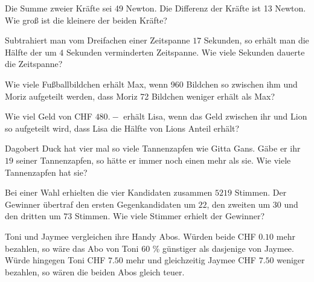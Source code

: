 \begin{bbwAufgabenBlock}


\item Die Summe zweier Kräfte sei 49 Newton. Die Differenz der Kräfte
ist 13 Newton. Wie groß ist die kleinere der beiden Kräfte?


\item Subtrahiert man vom Dreifachen einer Zeitspanne $17$ Sekunden, so
erhält man die Hälfte der um $4$ Sekunden verminderten Zeitspanne. Wie
viele Sekunden dauerte die Zeitspanne?


\noTRAINER{\newpage}

\item Wie viele Fußballbildchen erhält Max, wenn 960 Bildchen so
zwischen ihm und Moriz aufgeteilt werden, dass Moriz 72 Bildchen
weniger erhält als Max?



\item Wie viel Geld von CHF $480.-$ erhält Lisa, wenn das Geld
zwischen ihr und Lion so aufgeteilt wird, dass Lisa die Hälfte von
Lions Anteil erhält?


\item Dagobert Duck hat vier mal so viele Tannenzapfen wie Gitta
Gans. Gäbe er ihr $19$ seiner Tannenzapfen, so hätte er immer noch einen
mehr als sie. Wie viele Tannenzapfen hat sie?


\item Bei einer Wahl erhielten die vier Kandidaten zusammen $5219$
Stimmen. Der Gewinner übertraf den ersten Gegenkandidaten um $22$, den
zweiten um $30$ und den dritten um $73$ Stimmen. Wie viele Stimmer erhielt
der Gewinner?


\noTRAINER{\newpage}

\item Toni und Jaymee vergleichen ihre Handy Abos.
Würden beide CHF $0.10$ mehr bezahlen, so wäre das Abo von Toni 60 \% günstiger als dasjenige von Jaymee.
Würde hingegen Toni CHF $7.50$ mehr und gleichzeitig Jaymee CHF $7.50$ weniger bezahlen, so wären die beiden Abos gleich teuer.


\end{bbwAufgabenBlock}
